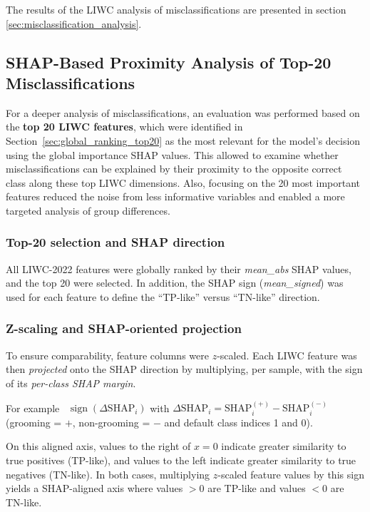 The results of the LIWC analysis of misclassifications are presented in section \ref{sec:misclassification_analysis}.

\subsection{SHAP-Based Proximity Analysis of Top-20 Misclassifications}

For a deeper analysis of misclassifications, an evaluation was performed based on the \textbf{top 20 LIWC features}, which were identified in Section~\ref{sec:global_ranking_top20} as the most relevant for the model's decision using the global importance SHAP values. This allowed to examine whether misclassifications can be explained by their proximity to the opposite correct class along these top LIWC dimensions. Also, focusing on the 20 most important features reduced the noise from less informative variables and enabled a more targeted analysis of group differences.

\subsubsection{Top-20 selection and SHAP direction}

All LIWC-2022 features were globally ranked by their \emph{mean\_abs} SHAP values, and the top 20 were selected. In addition, the SHAP sign (\emph{mean\_signed}) was used for each feature to define the “TP-like” versus “TN-like” direction.

\subsubsection{Z-scaling and SHAP-oriented projection}

To ensure comparability, feature columns were $z$-scaled. Each LIWC feature was then \emph{projected} onto the SHAP direction by multiplying, per sample, with the sign of its \emph{per-class SHAP margin}.  

For example \ $\operatorname{sign}(\Delta\mathrm{SHAP}_i)$ with
$\Delta\mathrm{SHAP}_i = \mathrm{SHAP}^{(+)}_i - \mathrm{SHAP}^{(-)}_i$ (grooming = $+$, non-grooming = $-$ and default class indices 1 and 0). 

On this aligned axis, values to the right of $x=0$ indicate greater similarity to true positives (TP-like), and values to the left indicate greater similarity to true negatives (TN-like). In both cases, multiplying $z$-scaled feature values by this sign yields a SHAP-aligned axis where values $>0$ are TP-like and values $<0$ are TN-like.

